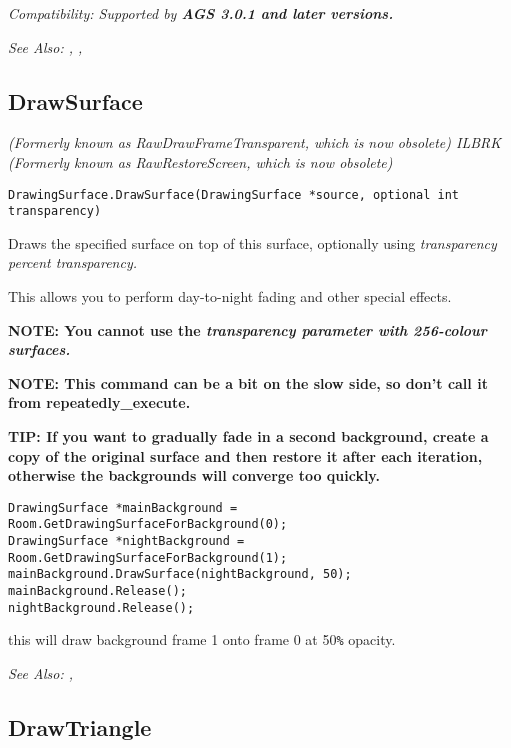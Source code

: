 \it{Compatibility:} Supported by \bf{AGS 3.0.1} and later versions.

\it{See Also:} ,
,


\subsection{DrawSurface}\label{DrawingSurface.DrawSurface}%

\it{(Formerly known as RawDrawFrameTransparent, which is now obsolete)} ILBRK
\it{(Formerly known as RawRestoreScreen, which is now obsolete)}

\begin{verbatim}
DrawingSurface.DrawSurface(DrawingSurface *source, optional int transparency)
\end{verbatim}
Draws the specified surface on top of this surface, optionally using \it{transparency}
percent transparency.

This allows you to perform day-to-night fading and other special effects.

\bf{NOTE:} You cannot use the \it{transparency} parameter with 256-colour surfaces.

\bf{NOTE:} This command can be a bit on the slow side, so don't call it from repeatedly_execute.

\bf{TIP:} If you want to gradually fade in a second background, create a copy of
the original surface and then restore it after each iteration, otherwise the backgrounds
will converge too quickly.

\begin{verbatim}
DrawingSurface *mainBackground = Room.GetDrawingSurfaceForBackground(0);
DrawingSurface *nightBackground = Room.GetDrawingSurfaceForBackground(1);
mainBackground.DrawSurface(nightBackground, 50);
mainBackground.Release();
nightBackground.Release();
\end{verbatim}
this will draw background frame 1 onto frame 0 at 50\verb$%$ opacity.

\it{See Also:} ,


\subsection{DrawTriangle}\label{DrawingSurface.DrawTriangle}%

